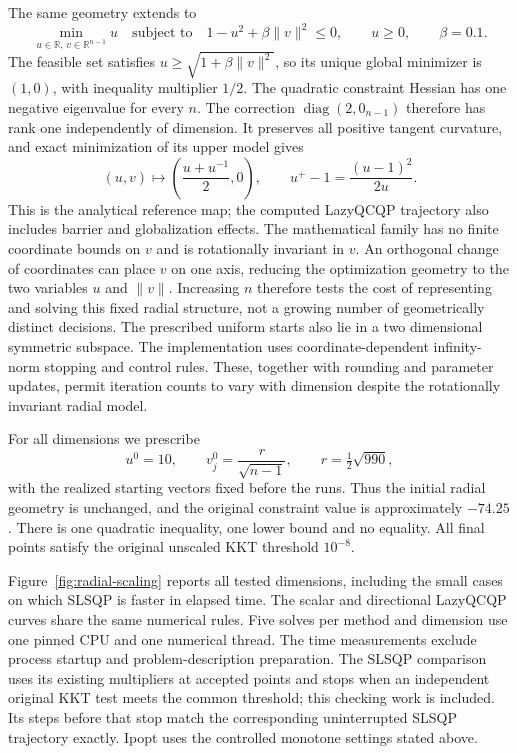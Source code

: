 \documentclass[pdflatex,sn-mathphys-num]{sn-jnl}
\theoremstyle{thmstyleone}
\theoremstyle{thmstylethree}
\begin{document}
The same geometry extends to
\begin{equation}\label{eq:radial-family}
 \min_{u\in\mathbb R,\,v\in\mathbb R^{n-1}} u
 \quad\text{subject to}\quad
 1-u^2+\beta\|v\|^2\leq0,\qquad u\geq0,
 \qquad \beta=0.1.
\end{equation}
The feasible set satisfies $u\geq\sqrt{1+\beta\|v\|^2}$, so its
unique global minimizer is $(1,0)$, with inequality multiplier $1/2$.
The quadratic constraint Hessian has one negative eigenvalue for every
$n$. The correction $\operatorname{diag}(2,0_{n-1})$ therefore has rank
one independently of dimension. It preserves all positive tangent
curvature, and exact minimization of its upper model gives
\[
 (u,v)\longmapsto\left(\frac{u+u^{-1}}2,0\right),\qquad
 u^+-1=\frac{(u-1)^2}{2u}.
\]
This is the analytical reference map; the computed LazyQCQP trajectory
also includes barrier and globalization effects.
The mathematical family has no finite coordinate bounds on $v$ and is
rotationally invariant in $v$. An orthogonal change of
coordinates can place $v$ on one axis, reducing the optimization geometry
to the two variables $u$ and $\|v\|$. Increasing $n$ therefore tests the
cost of representing and solving this fixed radial structure, not a
growing number of geometrically distinct decisions. The prescribed
uniform starts also lie in a two dimensional symmetric subspace.
The implementation uses coordinate-dependent infinity-norm stopping
and control rules. These, together with rounding and parameter updates,
permit iteration counts to vary with dimension despite the rotationally
invariant radial model.

For all dimensions we prescribe
\[
 u^0=10,\qquad
 v_j^0=\frac{r}{\sqrt{n-1}},\qquad
 r=\tfrac12\sqrt{990},
\]
with the realized starting vectors fixed before the runs. Thus the
initial radial geometry is unchanged, and the original constraint
value is approximately $-74.25$. There is one quadratic inequality,
one lower bound and no equality. All final points satisfy the original
unscaled KKT threshold $10^{-8}$.

Figure~\ref{fig:radial-scaling} reports all tested dimensions, including
the small cases on which SLSQP is faster in elapsed time. The scalar
and directional LazyQCQP curves share the same numerical rules. Five solves
per method and dimension use one pinned CPU and one numerical thread.
The time measurements
exclude process startup and problem-description preparation. The
SLSQP comparison uses its existing multipliers at accepted points and
stops when an independent original KKT test meets the common threshold;
this checking work is included. Its steps before that stop match the
corresponding uninterrupted SLSQP trajectory exactly. Ipopt uses the
controlled monotone settings stated above.
\end{document}
